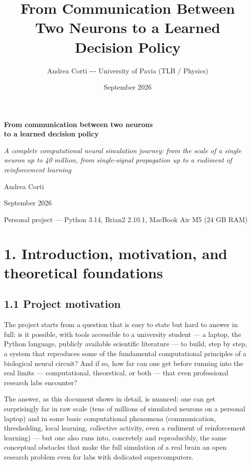 \documentclass[
  english,
]{article}
\title{From Communication Between Two Neurons to a Learned Decision Policy}
\author{Andrea Corti -\/-\/- University of Pavia (TLB / Physics)}
\date{September 2026}
\begin{document}
\maketitle

{
\setcounter{tocdepth}{2}
\tableofcontents
}
\textbf{From communication between two neurons\\
to a learned decision policy}

\emph{A complete computational neural simulation journey: from the scale of a single neuron up to 40 million, from single-signal propagation up to a rudiment of reinforcement learning}

Andrea Corti

September 2026

Personal project --- Python 3.14, Brian2 2.10.1, MacBook Air M5 (24 GB RAM)

\section{1. Introduction, motivation, and theoretical foundations}\label{introduction-motivation-and-theoretical-foundations}

\subsection{1.1 Project motivation}\label{project-motivation}

The project starts from a question that is easy to state but hard to answer in full: is it possible, with tools accessible to a university student --- a laptop, the Python language, publicly available scientific literature --- to build, step by step, a system that reproduces some of the fundamental computational principles of a biological neural circuit? And if so, how far can one get before running into the real limits --- computational, theoretical, or both --- that even professional research labs encounter?

The answer, as this document shows in detail, is nuanced: one can get surprisingly far in raw scale (tens of millions of simulated neurons on a personal laptop) and in some basic computational phenomena (communication, thresholding, local learning, collective activity, even a rudiment of reinforcement learning) --- but one also runs into, concretely and reproducibly, the same conceptual obstacles that make the full simulation of a real brain an open research problem even for labs with dedicated supercomputers.
\end{document}
